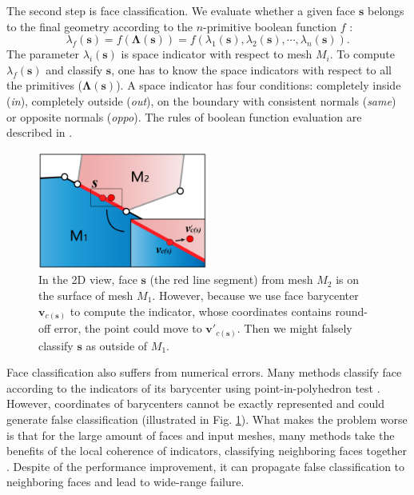 \documentclass[10pt,journal,compsoc]{IEEEtran}
\begin{document}
The second step is face classification. We evaluate whether a given face $\bm{s}$ belongs to the final geometry according to the $n$-primitive boolean function $f$ :
\begin{equation}
\lambda_f(\bm{s}) = f(\boldsymbol{\Lambda}(\bm{s})) = f(\lambda_1(\bm{s}), \lambda_2(\bm{s}), \cdots, \lambda_n(\bm{s})).
\end{equation}
The parameter $\lambda_i(\bm{s})$ is space indicator with respect to mesh $M_i$. To compute $\lambda_f(\bm{s})$ and classify $\bm{s}$, one has to know the space indicators with respect to all the primitives ($\boldsymbol{\Lambda}(\bm{s})$). A space indicator has four conditions: completely inside (\emph{in}), completely outside (\emph{out}), on the boundary with consistent normals (\emph{same}) or opposite normals (\emph{oppo}). The rules of boolean function evaluation are described in \cite{douze2015quickcsg,feito2013fast}.

\begin{figure}[t]
\centering
\includegraphics[width=2.2in]{boolean-01}
\caption{In the 2D view, face $\bm{s}$ (the red line segment) from mesh $M_2$ is on the surface of mesh $M_1$. However, because we use face barycenter $\bm{v}_{c(\bm{s})}$ to compute the indicator, whose coordinates contains round-off error, the point could  move to $\bm{v'}_{c(\bm{s})}$. Then we might falsely classify $\bm{s}$ as outside of $M_1$.}
\label{fig:falseclass}
\end{figure}

Face classification also suffers from numerical errors. Many methods classify face according to the indicators of its barycenter using point-in-polyhedron test \cite{feito2013fast,campen2010exact}. However, coordinates of barycenters cannot be exactly represented and could generate false classification (illustrated in Fig. \ref{fig:falseclass}). What makes the problem worse is that for the large amount of faces and input meshes, many methods \cite{pavic2010hybrid,feito2013fast,ogayar2015deferred,zhou2016mesh} take the benefits of the local coherence of indicators, classifying neighboring faces together . Despite of the performance improvement, it can propagate false classification to neighboring faces and lead to wide-range failure.
\end{document}

